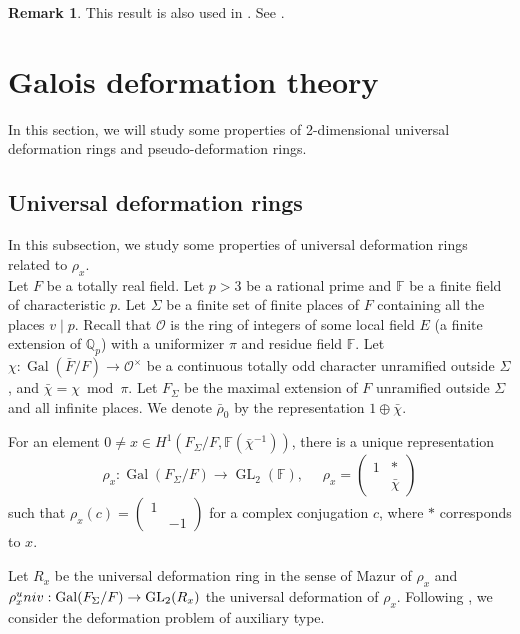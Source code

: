 \documentclass[12pt]{amsart}
\theoremstyle{plain}
\theoremstyle{definition}
\newtheorem{rem}[thm]{Remark}
\theoremstyle{remark}
\begin{document}
\begin{rem}
	This result is also used in \cite{ZHANG2024}. See \cite[Lemma 4.2.5 \& 5.1.2]{ZHANG2024}.
\end{rem}



\section{Galois deformation theory}
In this section, we will study some properties of 2-dimensional universal deformation rings and pseudo-deformation rings.


\subsection{Universal deformation rings}	
In this subsection, we study some properties of universal deformation rings related to $ \rho_x$.\\

Let $F$ be a totally real field. Let $p>3$ be a rational prime and $\mathbb{F}$ be a finite field of characteristic $p$. Let $\Sigma$ be a finite set of finite places of $F$ containing all the places $v \mid p$. Recall that $\mathcal{O}$ is the ring of integers of some local field $E$ (a finite extension of $\mathbb{Q}_p$) with a uniformizer $\pi$ and residue field $\mathbb{F}$. Let $\chi: \operatorname{Gal}(\bar{F}/F) \to \mathcal{O}^\times$ be a continuous totally odd character unramified outside $\Sigma$, and $\bar{\chi}=\chi ~\operatorname{mod} ~\pi$. Let $F_{\Sigma}$ be the maximal extension of $F$ unramified outside $\Sigma$ and all infinite places. We denote $\bar{\rho}_0$ by the representation $1 \oplus \bar{\chi}$.


For an element $0 \ne x \in H^1(F_{\Sigma}/F, \mathbb{F}(\bar{\chi}^{-1}))$, there is a unique representation$$
\rho_x: \operatorname{Gal}(F_{\Sigma}/F) \to \operatorname{GL}_2 (\mathbb{F}), ~~~~~~\rho_x=
\begin{pmatrix}
	1 &  *\\
	~& \bar{\chi}
\end{pmatrix}$$
such that $\rho_x(c)=
\begin{pmatrix}
	1 & ~\\
	~& -1
\end{pmatrix}$ for a complex conjugation $c$, where $*$ corresponds to $x$.

Let $R_x$ be the universal deformation ring in the sense of Mazur \cite{mazur1989deforming} of $ \rho_x$
and $\rho_x^\textnormal{univ}: \operatorname{Gal}(F_{\Sigma}/F) \to \operatorname{GL}_2 (R_x)$ the universal deformation of $ \rho_x$.
Following \cite[Proposition 2.4]{skinner1999residually}, we consider the deformation problem of auxiliary type. 
\end{document}

